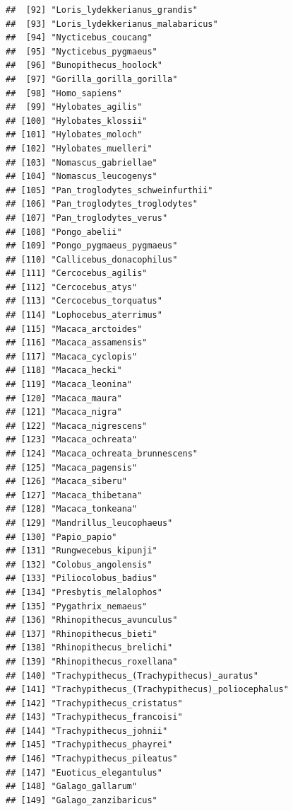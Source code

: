 \documentclass[]{article}
\begin{document}
\begin{verbatim}
##  [92] "Loris_lydekkerianus_grandis"                  
##  [93] "Loris_lydekkerianus_malabaricus"              
##  [94] "Nycticebus_coucang"                           
##  [95] "Nycticebus_pygmaeus"                          
##  [96] "Bunopithecus_hoolock"                         
##  [97] "Gorilla_gorilla_gorilla"                      
##  [98] "Homo_sapiens"                                 
##  [99] "Hylobates_agilis"                             
## [100] "Hylobates_klossii"                            
## [101] "Hylobates_moloch"                             
## [102] "Hylobates_muelleri"                           
## [103] "Nomascus_gabriellae"                          
## [104] "Nomascus_leucogenys"                          
## [105] "Pan_troglodytes_schweinfurthii"               
## [106] "Pan_troglodytes_troglodytes"                  
## [107] "Pan_troglodytes_verus"                        
## [108] "Pongo_abelii"                                 
## [109] "Pongo_pygmaeus_pygmaeus"                      
## [110] "Callicebus_donacophilus"                      
## [111] "Cercocebus_agilis"                            
## [112] "Cercocebus_atys"                              
## [113] "Cercocebus_torquatus"                         
## [114] "Lophocebus_aterrimus"                         
## [115] "Macaca_arctoides"                             
## [116] "Macaca_assamensis"                            
## [117] "Macaca_cyclopis"                              
## [118] "Macaca_hecki"                                 
## [119] "Macaca_leonina"                               
## [120] "Macaca_maura"                                 
## [121] "Macaca_nigra"                                 
## [122] "Macaca_nigrescens"                            
## [123] "Macaca_ochreata"                              
## [124] "Macaca_ochreata_brunnescens"                  
## [125] "Macaca_pagensis"                              
## [126] "Macaca_siberu"                                
## [127] "Macaca_thibetana"                             
## [128] "Macaca_tonkeana"                              
## [129] "Mandrillus_leucophaeus"                       
## [130] "Papio_papio"                                  
## [131] "Rungwecebus_kipunji"                          
## [132] "Colobus_angolensis"                           
## [133] "Piliocolobus_badius"                          
## [134] "Presbytis_melalophos"                         
## [135] "Pygathrix_nemaeus"                            
## [136] "Rhinopithecus_avunculus"                      
## [137] "Rhinopithecus_bieti"                          
## [138] "Rhinopithecus_brelichi"                       
## [139] "Rhinopithecus_roxellana"                      
## [140] "Trachypithecus_(Trachypithecus)_auratus"      
## [141] "Trachypithecus_(Trachypithecus)_poliocephalus"
## [142] "Trachypithecus_cristatus"                     
## [143] "Trachypithecus_francoisi"                     
## [144] "Trachypithecus_johnii"                        
## [145] "Trachypithecus_phayrei"                       
## [146] "Trachypithecus_pileatus"                      
## [147] "Euoticus_elegantulus"                         
## [148] "Galago_gallarum"                              
## [149] "Galago_zanzibaricus"
\end{verbatim}
\end{document}
